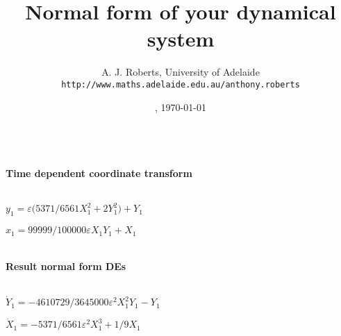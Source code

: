 \documentclass[11pt,a5paper]{article}
\title{Normal form of your dynamical system}
\author{A. J. Roberts, University of Adelaide\\
\texttt{http://www.maths.adelaide.edu.au/anthony.roberts}}
\date{\now, \today}
\begin{document}
\maketitle


\begin{math}
\end{math}
\paragraph{Time dependent coordinate transform}
\begin{math}
\end{math}\par

\begin{math}
y_{1}=\varepsilon  \big(5371/6561 X_{1}^{2}+2 Y_{1}^{2}\big)+Y_{1}
\end{math}\par

\begin{math}
x_{1}=99999/100000 \varepsilon  X_{1} Y_{1}+X_{1}
\end{math}\par

\begin{math}
\end{math}
\paragraph{Result normal form DEs}
\begin{math}
\end{math}\par

\begin{math}
\dot Y_{1}=-4610729/3645000 \varepsilon ^{2} X_{1}^{2} Y_{1}-Y_{1}
\end{math}\par

\begin{math}
\dot X_{1}=-5371/6561 \varepsilon ^{2} X_{1}^{3}+1/9 X_{1}
\end{math}\par
\end{document}
